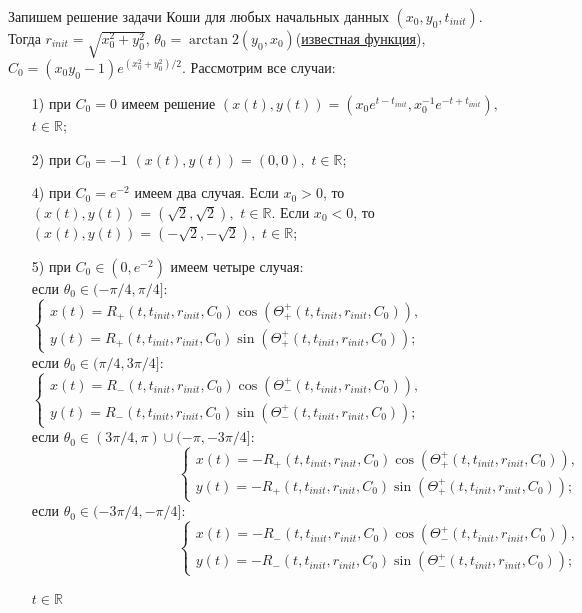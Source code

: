 \documentclass{article}
\begin{document}
Запишем решение задачи Коши для любых начальных данных $(x_0, y_0, t_{init})$. Тогда $r_{init} = \sqrt{x_0^2 + y_0^2}$, $\theta_0 = \arctan2(y_0, x_0)$(\href{https://en.wikipedia.org/wiki/Atan2}{известная функция}), $C_{0} = (x_0y_0 - 1)e^{(x_0^2+y_0^2)/2}$. Рассмотрим все случаи:
\begin{enumerate}
    \item[{1)}] при $C_0 = 0$ имеем решение $(x(t), y(t)) = (x_0e^{t-t_{init}}, x_0^{-1}e^{-t+t_{init}}),$ $t\in \mathbb{R}$;
    \item[{2)}] при $C_0 = -1$ $(x(t), y(t)) = (0,0),$ $t\in \mathbb{R}$;
    \item[{4)}] при $C_0 = e^{-2}$ имеем два случая. Если $x_ 0> 0$, то $(x(t), y(t)) = (\sqrt{2},\sqrt{2}),$ $t\in \mathbb{R}$. Если $x_ 0< 0$, то $(x(t), y(t)) = (-\sqrt{2},-\sqrt{2}),$ $t\in \mathbb{R}$;
\item[{5)}] при $C_0\in(0,e^{-2})$ имеем четыре случая:\\
если $\theta_0 \in (-\pi/4, \pi/4]$:
$ \begin{cases}
       x(t) = R_+(t,t_{init}, r_{init}, C_0)\cos(\Theta^+_+(t,t_{init},r_{init},C_0)),\\
       y(t) = R_+(t,t_{init}, r_{init}, C_0)\sin(\Theta^+_+(t,t_{init},r_{init},C_0));
\end{cases}$ \\
если $\theta_0 \in (\pi/4, 3\pi/4]$:
$ \begin{cases}
       x(t) = R_-(t,t_{init}, r_{init}, C_0)\cos(\Theta^+_-(t,t_{init},r_{init},C_0)),\\
       y(t) = R_-(t,t_{init}, r_{init}, C_0)\sin(\Theta^+_-(t,t_{init},r_{init},C_0));
\end{cases}$ \\
если $ \theta_0 \in (3\pi/4, \pi)\cup(-\pi, -3\pi/4]$:\\
$\hspace{125pt} \begin{cases}
       x(t) = -R_+(t,t_{init}, r_{init}, C_0)\cos(\Theta^+_+(t,t_{init},r_{init},C_0)),\\
       y(t) = -R_+(t,t_{init}, r_{init}, C_0)\sin(\Theta^+_+(t,t_{init},r_{init},C_0));
\end{cases}$ \\
если $\theta_0 \in (-3\pi/4, -\pi/4]$:\\
$\hspace{125pt} \begin{cases}
       x(t) = -R_-(t,t_{init}, r_{init}, C_0)\cos(\Theta^+_-(t,t_{init},r_{init},C_0)),\\
       y(t) = -R_-(t,t_{init}, r_{init}, C_0)\sin(\Theta^+_-(t,t_{init},r_{init},C_0));
\end{cases}$ \\
\begin{center}
    $t\in \mathbb{R}$
\end{center}


\end{enumerate}
\end{document}
